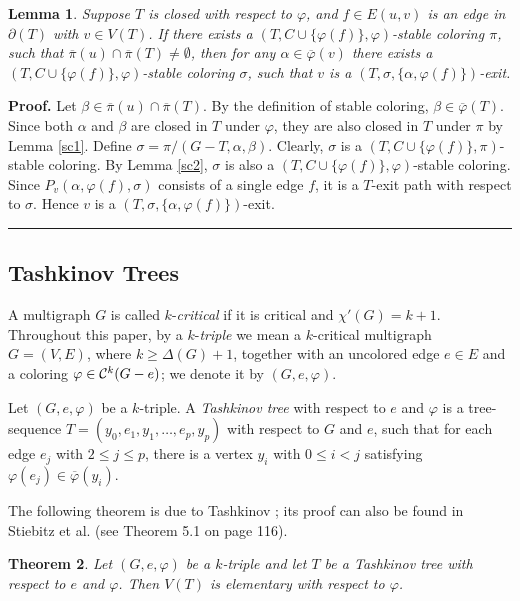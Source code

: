 \documentclass[11pt]{article}
\newtheorem{theorem}{Theorem}[section]
\newtheorem{lemma}[theorem]{Lemma}
\newcommand{\phibar}{\overline{\varphi}}
\newcommand{\phiv}{\varphi}
\def\qed{\hfill \rule{4pt}{7pt}}
\begin{document}
\begin{lemma}\label{LEM:extable}
Suppose $T$ is closed with respect to $\varphi$, and $f\in E(u,v)$ is an edge in $\partial (T)$ with $v \in V(T)$. If there 
exists a $(T, C\cup \{\phiv(f)\}, \phiv)$-stable coloring $\pi$, such that  $\overline{\pi}(u) \cap \overline{\pi}(T)
\ne \emptyset$, then for any $\alpha \in \phibar(v)$ there exists a $(T, C\cup \{\phiv(f)\}, \phiv)$-stable coloring $\sigma$, 
such that $v$ is a $(T, \sigma, \{\alpha, \phiv(f)\})$-exit. 
\end{lemma}
 
{\bf Proof.} Let $\beta \in \overline{\pi}(u) \cap \overline{\pi}(T)$. By the definition of stable coloring, $\beta \in \phibar(T)$.
Since both $\alpha$ and $\beta$ are closed in $T$ under $\varphi$, they are also closed in $T$ under $\pi$ by Lemma \ref{sc1}. Define 
$\sigma=\pi/ (G-T, \alpha,\beta)$. Clearly, $\sigma$ is a $(T, C\cup \{\phiv(f)\}, \pi)$-stable coloring. By Lemma \ref{sc2}, $\sigma$ 
is also a $(T, C\cup \{\phiv(f)\}, \phiv)$-stable coloring. Since $P_v(\alpha, \phiv(f), \sigma)$ consists of a single edge $f$, it 
is a $T$-exit path with respect to $\sigma$. Hence $v$ is a $(T, \sigma, \{\alpha, \phiv(f)\})$-exit. \qed


\subsection{Tashkinov Trees}

A multigraph $G$ is called $k$-{\em critical}\label{kcritical} if it is critical and $\chi'(G)=k+1$. Throughout this paper, by 
a $k$-{\em triple}\label{ktriple} we mean a $k$-critical multigraph $G=(V,E)$, where $k \ge \Delta(G)+1$,  together with an 
uncolored edge $e\in E$ and a coloring $\varphi \in {\cal C}^k(G-e)$; we denote it by $(G,e, \varphi)$.  

Let $(G,e, \varphi)$ be a $k$-triple. A {\em Tashkinov tree}\label{tashkinovtree} with respect to $e$ and $\varphi$ is a 
tree-sequence $T=(y_0,e_1,y_1, \ldots, e_p, y_p)$ with respect to $G$ and $e$, such that 
for each edge $e_j$ with $2\le j \le p$, there is a vertex $y_i$ with $0 \le i <j$ satisfying
$\varphi(e_j) \in  \overline{\varphi}(y_i)$.

\vskip 2mm
The following theorem is due to Tashkinov \cite{T}; its proof can also be found in Stiebitz et al. 
\cite{SSTF}  (see Theorem 5.1 on page 116).

\begin{theorem} \label{TashTree}
Let $(G,e, \varphi)$ be a $k$-triple and let $T$ be a Tashkinov tree with respect to $e$ and $\varphi$.
Then $V(T)$ is elementary with respect to $\varphi$. 
\end{theorem} 
\end{document}
